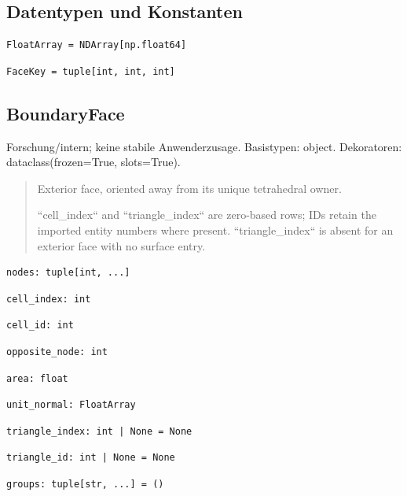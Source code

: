 \subsection*{Datentypen und Konstanten}
\begin{lstlisting}
FloatArray = NDArray[np.float64]
\end{lstlisting}
\begin{lstlisting}
FaceKey = tuple[int, int, int]
\end{lstlisting}
\subsection{BoundaryFace}
Forschung/intern; keine stabile Anwenderzusage.
Basistypen: object. Dekoratoren: dataclass(frozen=True, slots=True).
\begin{quote}
Exterior face, oriented away from its unique tetrahedral owner.\par ``cell\_index`` and ``triangle\_index`` are zero-based rows; IDs retain the imported entity numbers where present. ``triangle\_index`` is absent for an exterior face with no surface entry.
\end{quote}
\begin{lstlisting}
nodes: tuple[int, ...]
\end{lstlisting}
\begin{lstlisting}
cell_index: int
\end{lstlisting}
\begin{lstlisting}
cell_id: int
\end{lstlisting}
\begin{lstlisting}
opposite_node: int
\end{lstlisting}
\begin{lstlisting}
area: float
\end{lstlisting}
\begin{lstlisting}
unit_normal: FloatArray
\end{lstlisting}
\begin{lstlisting}
triangle_index: int | None = None
\end{lstlisting}
\begin{lstlisting}
triangle_id: int | None = None
\end{lstlisting}
\begin{lstlisting}
groups: tuple[str, ...] = ()
\end{lstlisting}
